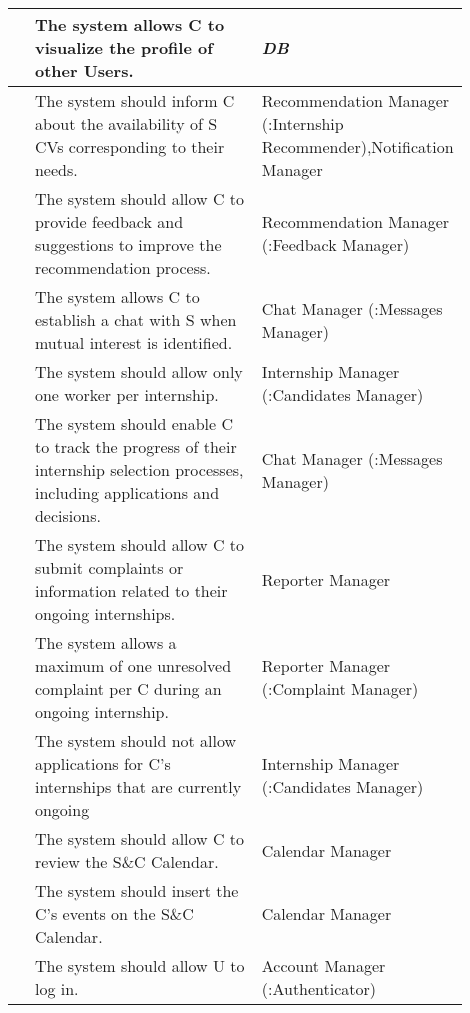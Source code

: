 \begin{center}
\begin{longtable}{|l|p{0.5\linewidth}|p{0.4\linewidth}|}
        \hline
        [R\creq] & The system allows C to visualize the profile of other Users. & \textit{DB}\\
        \hline
        [R\creq] & The system should inform C about the availability of S CVs corresponding to their needs. & Recommendation Manager \newline (:Internship Recommender),\newline Notification Manager\\
        \hline
        [R\creq] & The system should allow C to provide feedback and suggestions to improve the recommendation process. & Recommendation Manager \newline (:Feedback Manager)\\
        \hline
        [R\creq] & The system allows C to establish a chat with S when mutual interest is identified. & Chat Manager \newline (:Messages Manager)\\
        \hline
        [R\creq] & The system should allow only one worker per internship. & Internship Manager \newline (:Candidates Manager) \\
        \hline
        [R\creq] & The system should enable C to track the progress of their internship selection processes, including applications and decisions. & Chat Manager \newline (:Messages Manager)\\
        \hline
        [R\creq] & The system should allow C to submit complaints or information related to their ongoing internships. & Reporter Manager\\
        \hline
        [R\creq] & The system allows a maximum of one unresolved complaint per C during an ongoing internship. & Reporter Manager \newline (:Complaint Manager)\\
        \hline
        [R\creq] & The system should not allow applications for C’s internships that are currently ongoing & Internship Manager \newline (:Candidates Manager)\\
        \hline
        [R\creq] & The system should allow C to review the S\&C Calendar. & Calendar Manager\\
        \hline
        [R\creq] & The system should insert the C’s events on the S\&C Calendar. & Calendar Manager\\
        \hline
        [R\creq] & The system should allow U to log in. & Account Manager \newline (:Authenticator) \\

\end{longtable}
\end{center}
